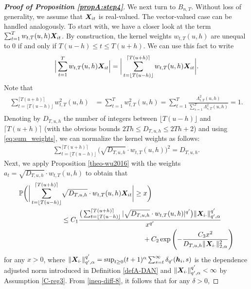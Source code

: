 \begin{proof}[\textnormal{\textbf{Proof of Proposition \ref{propA:step4}}}]
We next turn to $B_{n,T}$. Without loss of generality, we assume that $\boldsymbol{X}_{it}$ is real-valued. The vector-valued case can be handled analogously. To start with, we have a closer look at the term $\sum_{t=1}^T w_{t,T}(u,h) \boldsymbol{X}_{it}$. By construction, the kernel weights $w_{t, T}(u, h)$ are unequal to $0$ if and only if $T(u-h) \le t \le T(u+h)$. We can use this fact to write
\begin{align*}
\Big| \sum_{t=1}^T w_{t,T}(u,h) \boldsymbol{X}_{it}   \Big|  = \bigg| \sum_{t=\lfloor T(u-h) \rfloor}^{\lceil T(u+h) \rceil} w_{t,T}(u,h) \boldsymbol{X}_{it}   \bigg|.
\end{align*}
Note that
\begin{align}\label{eq:sum_weights}
\begin{split}
\sum_{t=\lfloor T(u-h) \rfloor}^{\lceil T(u+h) \rceil} w^2_{t,T}(u,h) &= \sum_{t=1}^T w^2_{t,T}(u,h) = \sum_{t=1}^T\frac{\Lambda^2_{t,T}(u,h)}{\sum\nolimits_{s=1}^T\Lambda^2_{s,T}(u,h) } = 1.
\end{split}
\end{align}
Denoting by $D_{T, u, h}$ the number of integers between $\lfloor T(u-h) \rfloor$ and $\lceil T(u+h) \rceil$ (with the obvious bounds $2Th \leq D_{T, u, h} \leq 2Th + 2$) and using \eqref{eq:sum_weights}, we can normalize the kernel weights as follows:
\begin{align*}
\sum_{t=\lfloor T(u-h) \rfloor}^{\lceil T(u+h) \rceil} \big(\sqrt{D_{T, u, h}}\cdot w_{t,T}(u,h)\big)^2 = D_{T, u, h}.
\end{align*}
Next, we apply Proposition \ref{theo-wu2016} with the weights $a_t = \sqrt{D_{T, u, h}}\cdot w_{t,T}(u,h)$ to obtain that
\begin{align}
\mathbb{P} \bigg(\bigg| \sum_{t=\lfloor T(u-h) \rfloor}^{\lceil T(u+h) \rceil} & \sqrt{D_{T, u, h}}\cdot w_{t,T}(u,h) \boldsymbol{X}_{it}  \bigg| \geq x\bigg) \nonumber \\
 & \leq C_1 \frac{\big( \sum_{t=\lfloor T(u-h) \rfloor}^{\lceil T(u+h) \rceil} |\sqrt{D_{T, u, h}}\cdot w_{t,T}(u,h)|^{q^\prime}\big) \| \boldsymbol{X}_{i \cdot}\|^{q^\prime}_{q^\prime, \alpha}}{ x^{q^\prime}} \nonumber \\
 & \qquad \qquad \qquad \qquad \qquad \qquad + C_2 \exp \left(-\frac{C_3  x^2}{D_{T, u, h}\| \boldsymbol{X}_{i\cdot}\|^{2}_{2, \alpha}}\right) \label{ineq-diff-8}
\end{align}
for any $x > 0$, where \textcolor{red}{$\| \boldsymbol{X}_{i\cdot}\|^{q^\prime}_{q^\prime, \alpha} = \sup_{t\geq 0} (t+1)^{\alpha} \sum_{s=t}^{\infty}\delta_{q^\prime}(\boldsymbol{h}_i, s)$} is the dependence adjusted norm introduced in Definition \ref{defA-DAN} and $\| \boldsymbol{X}_{i\cdot}\|^{q^\prime}_{q^\prime, \alpha} < \infty$ by Assumption \ref{C-reg3}. From \eqref{ineq-diff-8}, it follows that for any $\delta > 0$, 

\end{proof}
